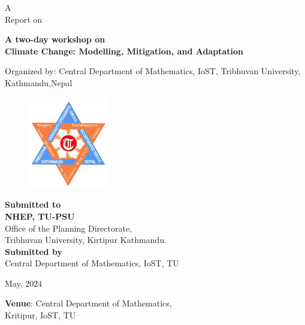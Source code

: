 \documentclass[a4paper,12pt]{report}
\begin{document}
  \thispagestyle{empty}
  \vspace*{2mm}
  \begin{center}
  {\Large
  A\\
  Report on}\\[3mm]
  \begin{tcolorbox}[colback=blue!20, colframe=blue!20]
    \centering
  {\bfseries \Large   A two-day workshop on \\[3mm]
  Climate Change:  Modelling,  Mitigation,  and  Adaptation}
  \end{tcolorbox}
\vspace{7mm}
    Organized by: \textcolor{blue!50!cyan}{Central Department of Mathematics, IoST, Tribhuvan University, Kathmandu,Nepal}

    \vspace{7mm}
    \begin{figure}[h!]
      \centering
      \includegraphics[width=3.5cm, height=4cm]{tulogo1.png}
    \end{figure}

    \vspace{17mm}

    {\bfseries \Large Submitted to} \\[5mm]

    \textbf{NHEP, TU-PSU}\\
    Office of the Planning Directorate,\\
    Tribhuvan University, Kirtipur Kathmandu.\\[10mm]

     {\bfseries Submitted by} \\[1mm]
     \textcolor{blue!50!cyan}{Central Department of Mathematics, IoST, TU}

     \vspace{10mm}
     May, 2024
     \vspace{3mm}
     \begin{tcolorbox}[colback=blue!20, colframe=blue!20]
       \Large \centering
       \textbf{Venue}: \hspace{2mm} Central Department of Mathematics, \\
       Kritipur, IoST, TU
     \end{tcolorbox}

\end{center}
\end{document}
